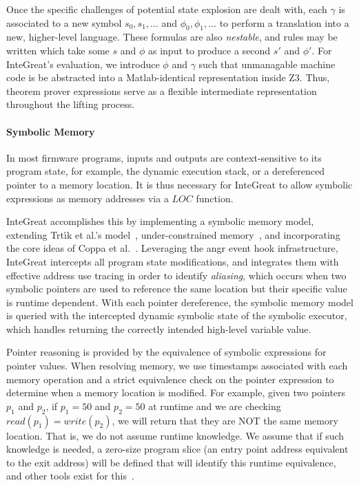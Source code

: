 Once the specific challenges of potential state explosion are dealt with, each $\gamma$ is associated to a new symbol $s_{0}, s_{1}, \dots$ and $\phi_{0}, \phi_{1}, \dots$ to perform a translation into a new, higher-level language.
These formulas are also \emph{nestable}, and rules may be written which take some $s$ and $\phi$ as input to produce a second $s'$ and $\phi'$.
For InteGreat's evaluation, we introduce $\phi$ and $\gamma$ such that unmanagable machine code is be abstracted into a Matlab-identical representation inside Z3.
Thus, theorem prover expressions serve as a flexible intermediate representation throughout the lifting process.

\paragraph{Symbolic Memory}
\label{sec:symb-mem-expl}
In most firmware programs, inputs and outputs are context-sensitive to its program state, for example, the dynamic execution stack, or a dereferenced pointer to a memory location.
It is thus necessary for InteGreat to allow symbolic expressions as memory addresses via a $LOC$ function.

InteGreat accomplishes this by implementing a symbolic memory model, extending Trt{\'\i}k et al.'s model~\cite{symbolic-memory}, under-constrained memory~\cite{Under-Constrained}, and incorporating the core ideas of Coppa et al.~\cite{coppa2017rethinking}.
Leveraging the angr event hook infrastructure, InteGreat intercepts all program state modifications, and integrates them with effective address use tracing in order to identify \emph{aliasing}, which occurs when two symbolic pointers are used to reference the same location but their specific value is runtime dependent.
With each pointer dereference, the symbolic memory model is queried with the intercepted dynamic symbolic state of the symbolic executor, which handles returning the correctly intended high-level variable value.

Pointer reasoning is provided by the equivalence of symbolic expressions for pointer values.
When resolving memory, we use timestamps associated with each memory operation and a strict equivalence check on the pointer expression to determine when a memory location is modified.
For example, given two pointers $p_{1}$ and $p_{2}$, if $p_{1} = 50$ and $p_{2} = 50$ at runtime and we are checking $read(p_{1}) = write(p_{2})$, we will return that they are NOT the same memory location. 
That is, we do not assume runtime knowledge. 
We assume that if such knowledge is needed, a zero-size program slice (an entry point address equivalent to the exit address) will be defined that will identify this runtime equivalence, and other tools exist for this~\cite{hind2001pointer}.

